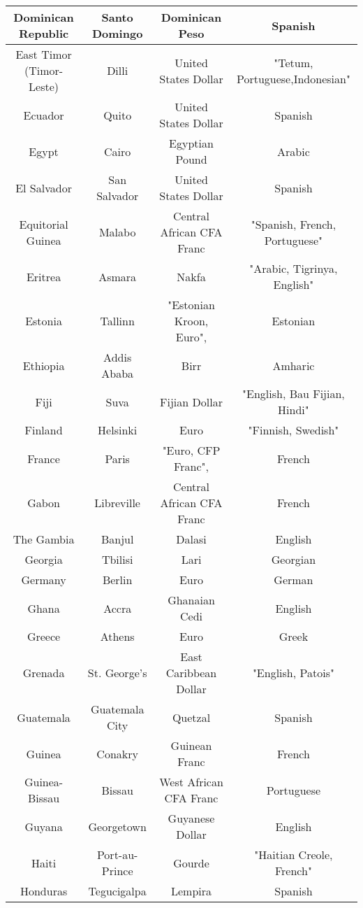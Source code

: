 \documentclass{article}
\begin{document}
\begin{center}
\begin{tabular} {||  c c c c  ||}
Dominican Republic & Santo Domingo & Dominican Peso & Spanish   \\ \hline 
East Timor (Timor-Leste) & Dilli & United States Dollar & "Tetum, Portuguese,Indonesian"   \\ \hline 
Ecuador & Quito & United States Dollar & Spanish   \\ \hline 
Egypt & Cairo & Egyptian Pound & Arabic   \\ \hline 
El Salvador & San Salvador & United States Dollar & Spanish   \\ \hline 
Equitorial Guinea & Malabo & Central African CFA Franc & "Spanish, French, Portuguese"   \\ \hline 
Eritrea & Asmara & Nakfa & "Arabic, Tigrinya, English"   \\ \hline 
Estonia & Tallinn & "Estonian Kroon, Euro", & Estonian   \\ \hline 
Ethiopia & Addis Ababa & Birr & Amharic   \\ \hline 
Fiji & Suva & Fijian Dollar & "English, Bau Fijian, Hindi"   \\ \hline 
Finland & Helsinki & Euro & "Finnish, Swedish"   \\ \hline 
France & Paris & "Euro, CFP Franc", & French   \\ \hline 
Gabon & Libreville & Central African CFA Franc & French   \\ \hline 
The Gambia & Banjul & Dalasi & English   \\ \hline 
Georgia & Tbilisi & Lari & Georgian   \\ \hline 
Germany & Berlin & Euro & German   \\ \hline 
Ghana & Accra & Ghanaian Cedi & English   \\ \hline 
Greece & Athens & Euro & Greek   \\ \hline 
Grenada & St. George's & East Caribbean Dollar & "English, Patois"   \\ \hline 
Guatemala & Guatemala City & Quetzal & Spanish   \\ \hline 
Guinea & Conakry & Guinean Franc & French   \\ \hline 
Guinea-Bissau & Bissau & West African CFA Franc & Portuguese   \\ \hline 
Guyana & Georgetown & Guyanese Dollar & English   \\ \hline 
Haiti & Port-au-Prince & Gourde & "Haitian Creole, French"   \\ \hline 
Honduras & Tegucigalpa & Lempira & Spanish   \\ \hline 

\end{tabular}
\end{center}
\end{document}
